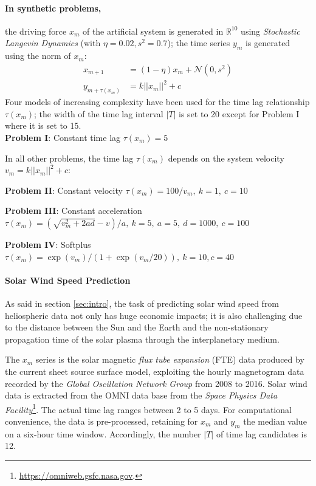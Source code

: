 
\paragraph{In synthetic problems,} the driving force $x_m$ of the artificial system is generated in $\mathbb{R}^{10}$ using \emph{Stochastic Langevin Dynamics} (with $\eta = 0.02, s^2 = 0.7$); the time series $y_m$ is generated using the norm of $x_m$: 
\begin{align}
 x_{m+1} &= (1 - \eta) x_m + \mathcal{N}(0, s^2) \label{eq:data}\\
 y_{m+\tau(x_m)} &= k ||x_m||^2 + c \label{eq:outputs}
\end{align}
Four models of increasing complexity have been used for the time lag relationship $\tau(x_m)$; the width of the time lag interval $|T|$ is set to 20 except for Problem I where it is set to 15.\\

{\bf Problem I}: Constant time lag $\tau(x_m) = 5$

In all other problems, the time lag $\tau(x_m)$ depends on the system velocity $v_m = k ||x_m||^2 + c$: 

{\bf Problem II}: Constant velocity $\tau(x_m) = 100/v_m,\ k = 1,\ c = 10$

{\bf Problem III}: Constant acceleration $\tau(x_m) = (\sqrt{v_m^2 + 2ad} - v)/a,\ k = 5,\ a = 5,\ d = 1000, \ c = 100$

{\bf Problem IV}: Softplus $\tau(x_m) = \exp\left(v_m\right)/\left(1 + \exp(v_m/20)\right), \ k = 10, c = 40$

\paragraph{Solar Wind Speed Prediction}\label{sec:solarwind}
As said in section \ref{sec:intro}, the task of predicting solar wind speed from heliospheric data not only 
has huge economic impacts; it is also challenging due to the distance between the Sun and the Earth and the non-stationary propagation time of the solar plasma through the interplanetary medium. 

The $x_m$ series is the solar magnetic \emph{flux tube expansion} (FTE) data produced by the {current sheet source surface} \citep{csss} model, exploiting the hourly magnetogram data recorded by the \emph{Global Oscillation Network Group} from 2008 to 2016.
Solar wind data is extracted from the OMNI data base from the \emph{Space Physics Data Facility}\footnote{\url{https://omniweb.gsfc.nasa.gov}.}. The actual time lag ranges between 2 to 5 days. For computational convenience, the data is pre-processed, retaining for $x_m$ and $y_m$ the median value on a six-hour time window. Accordingly, the number $|T|$ of time lag candidates is 12.  

